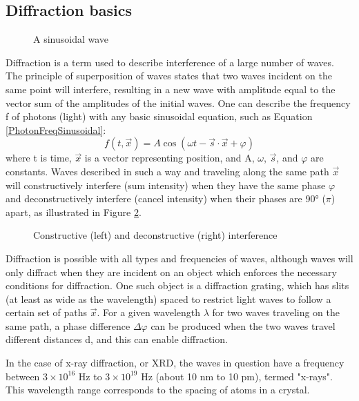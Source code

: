 \subsection{Diffraction basics}
\begin{figure}[htbp]
  \centering
  
  \caption{A sinusoidal wave}
  \label{basicwave}
\end{figure}
Diffraction is a term used to describe interference of a large number of waves. The principle of superposition of waves states that two waves incident on the same point will interfere, resulting in a new wave with amplitude equal to the vector sum of the amplitudes of the initial waves. One can describe the frequency f of photons (light) with any basic sinusoidal equation, such as Equation \ref{PhotonFreqSinusoidal}:
\begin{equation}
     f(t,\vec{x})=A\cos{(\omega t-\vec{s}\cdot\vec{x}+\varphi)}
    \label{PhotonFreqSinusoidal}
\end{equation}
where t is time, $\vec{x}$ is a vector representing position, and A, $\omega$, $\vec{s}$, and $\varphi$ are constants. Waves described in such a way and traveling along the same path $\vec{x}$ will constructively interfere (sum intensity) when they have the same phase $\varphi$ and deconstructively interfere (cancel intensity) when their phases are \ang{90} ($\pi$) apart, as illustrated in Figure \ref{interference}.
\begin{figure}[htbp]
  \centering
  
  \caption{Constructive (left) and deconstructive (right) interference}
  \label{interference}
\end{figure}
Diffraction is possible with all types and frequencies of waves, although waves will only diffract when they are incident on an object which enforces the necessary conditions for diffraction. One such object is a diffraction grating, which has slits (at least as wide as the wavelength) spaced to restrict light waves to follow a certain set of paths $\vec{x}$. For a given wavelength $\lambda$ for two waves traveling on the same path, a phase difference $\Delta\varphi$ can be produced when the two waves travel different distances d, and this can enable diffraction.

In the case of x-ray diffraction, or XRD, the waves in question have a frequency between $3\times10^{16}$ Hz to $3\times10^{19}$ Hz (about 10 nm to 10 pm), termed "x-rays". This wavelength range corresponds to the spacing of atoms in a crystal.


